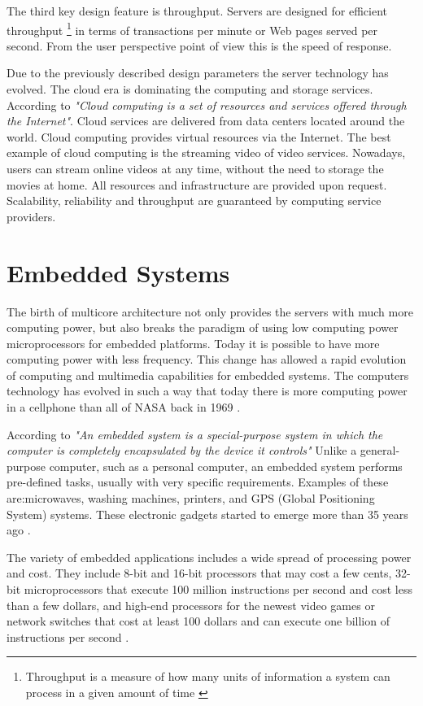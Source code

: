The third key design feature is throughput. Servers are designed for efficient
throughput \footnote{Throughput is a measure of how many units of information a
system can process in a given amount of time \cite{Dongxu}} in terms of
transactions per minute or Web pages served per second. From the user
perspective point of view this is the speed of response.

Due to the previously described design parameters the server technology has
evolved. The cloud era is dominating the computing and storage services.
According to \cite {Farhan} \textit{"Cloud computing is a set of resources and
services offered through the Internet"}. Cloud services are delivered from data
centers located around the world.  Cloud computing provides virtual resources
via the Internet. The best example of cloud computing is the streaming video of
video services. Nowadays, users can stream online videos  at any time, without the
need to storage the movies at home. All resources and infrastructure are
provided upon request. Scalability, reliability and throughput 
are guaranteed by computing service providers. 

\section{Embedded Systems}
\noindent

The birth of multicore architecture not only provides the servers with much
more computing power, but also breaks the paradigm of using low computing power
microprocessors for embedded platforms. Today it is possible to have more
computing power with less frequency. This change has allowed a rapid evolution
of computing and multimedia capabilities for embedded systems. The computers
technology has evolved in such a way that today there is more computing power
in a cellphone than all of NASA back in 1969 \cite{Michio}.

According to \cite{Hallinan} \textit{"An embedded system is a special-purpose
system in which the computer is completely encapsulated by the device it
controls"} Unlike a general-purpose computer, such as a personal computer, an
embedded system performs pre-defined tasks, usually with very specific
requirements. Examples of these are:microwaves, washing machines, printers, and
GPS (Global Positioning System) systems. These electronic gadgets started to
emerge more than 35 years ago \cite{Nur}.

The variety of embedded applications includes a wide spread of processing 
power and cost. They include 8-bit and 16-bit processors that may
cost a few cents, 32-bit microprocessors that execute 100 million instructions
per second and cost less than a few dollars, and high-end processors for the
newest video games or network switches that cost at least 100 dollars and can
execute one billion of instructions per second \cite{Hennessy}.

